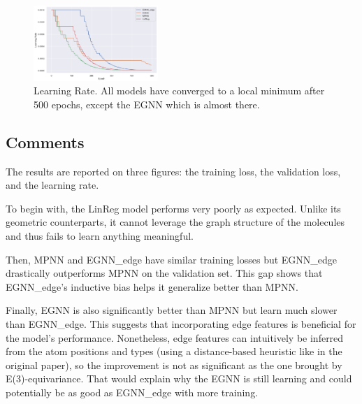 \documentclass[sigconf]{acmart}
\begin{document}
\begin{figure}
    \centering
    \includegraphics[width=0.42\textwidth]{figures/learning_rate.png}
    \caption{Learning Rate. All models have converged to a local minimum after 500 epochs, except the EGNN which is almost there.}
    \label{fig:learning-rate}
\end{figure}

\subsection{Comments}
The results are reported on three figures: the training loss, the validation loss, and the learning rate.

To begin with, the LinReg model performs very poorly as expected. Unlike its geometric counterparts, it cannot leverage the graph structure of the molecules and thus fails to learn anything meaningful.

Then, MPNN and EGNN\_edge have similar training losses but EGNN\_edge drastically outperforms MPNN on the validation set. This gap shows that EGNN\_edge's inductive bias helps it generalize better than MPNN.

Finally, EGNN is also significantly better than MPNN but learn much slower than EGNN\_edge. This suggests that incorporating edge features is beneficial for the model's performance.
Nonetheless, edge features can intuitively be inferred from the atom positions and types (using a distance-based heuristic like in the original paper), so the improvement is not as significant as the one brought by E(3)-equivariance.
That would explain why the EGNN is still learning and could potentially be as good as EGNN\_edge with more training.




\end{document}
